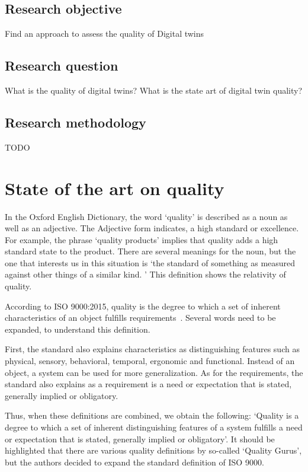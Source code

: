 \documentclass{llncs}
\begin{document}
    \subsection{Research objective}
    Find an approach to assess the quality of Digital twins~\cite{Jones2020}

    \subsection{Research question}\label{section: Research Questions}
    What is the quality of digital twins?
    What is the state art of digital twin quality?

    \subsection{Research methodology}
    TODO

    \section{State of the art on quality}
    In the Oxford English Dictionary, the word `quality' is described as a noun as well as an adjective. The Adjective form indicates, a high standard or excellence. 
    For example, the phrase `quality products' implies that quality adds a high standard state to the product. 
    There are several meanings for the noun, but the one that interests us in this situation is `the standard of something as measured against other things of a similar kind. \cite{OxfordDictionary}'
    This definition shows the relativity of quality.

    According to ISO 9000:2015, quality is the degree to which a set of inherent characteristics of an object fulfills requirements~\cite{ISO9000}. Several words need to be expanded, to understand this definition. 
    
    First, the standard also explains characteristics as distinguishing features such as physical, sensory, behavioral, temporal, ergonomic and functional. 
    Instead of an object, a system can be used for more generalization.
    As for the requirements, the standard also explains as a requirement is a need or expectation that is stated, generally implied or obligatory.~\cite{ISO9000}

    Thus, when these definitions are combined, we obtain the following: `Quality is a degree to which a set of inherent distinguishing features of a system fulfills a need or expectation that is stated, generally implied or obligatory'. 
    It should be highlighted that there are various quality definitions by so-called `Quality Gurus', but the authors decided to expand the standard definition of ISO 9000.
\end{document}
